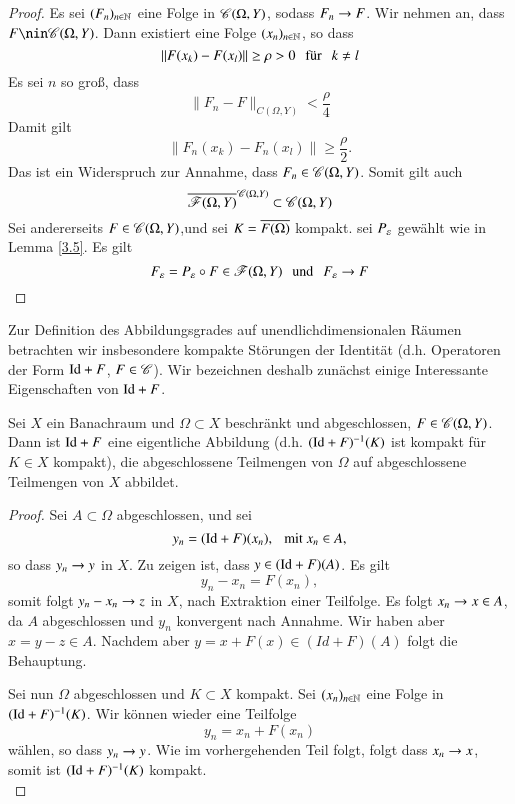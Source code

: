\begin{proof}
    Es sei $(F_n)_{n\in \mathbb{N}}$ eine Folge in $\mathscr C(\Omega,Y)$, sodass  $F_n\rightarrow F$. Wir nehmen an, dass
    $F\nin \ms C(\Omega,Y)$. Dann existiert eine Folge $(x_n)_{n\in \mathbb{N}}$, so dass
    \[
        \|F(x_k)-F(x_l)\|\geq \rho>0 \hspace{.25cm}\text{für}\hspace{.25cm} k\neq l
    \]
    Es sei $n$ so groß, dass
    \[
        \|F_n-F\|_{ C(\Omega,Y)}<\frac{\rho}{4}
    \]
    Damit gilt
    \[
        \|F_n(x_k)-F_n(x_l)\|\geq \frac\rho2.
    \]
    Das ist ein Widerspruch zur Annahme, dass $F_n\in \mathscr C(\Omega,Y)$. Somit gilt auch
    \[
        \overline{\mathscr F(\Omega,Y)}^{\mathscr C(\Omega,Y)}\subset \mathscr C(\Omega,Y)
    \]
    Sei andererseits $F\in \mathscr C(\Omega,Y)$,und sei $K=\overline{F(\Omega)}$ kompakt. sei $P_\varepsilon$ gewählt wie
    in Lemma \ref{3.5}. Es gilt
    \[
        F_\varepsilon=P_\varepsilon\circ F\in \mathscr F(\Omega,Y) \hspace{.25cm} \text{und}\hspace{.25cm} F_\varepsilon\rightarrow F
    \]
\end{proof}

Zur Definition des Abbildungsgrades auf unendlichdimensionalen Räumen betrachten wir insbesondere
kompakte Störungen der Identität (d.h. Operatoren der Form $\mathrm{Id}+F$, $F\in \mathscr C$). Wir bezeichnen deshalb
zunächst einige Interessante Eigenschaften von $\mathrm{Id}+F$.

\begin{lem}\label{3.7}
    Sei $X$ ein Banachraum und $\Omega\subset X$ beschränkt und abgeschlossen, $F\in \mathscr C(\Omega,Y)$.
    Dann ist $\mathrm{Id} + F$ eine eigentliche Abbildung (d.h. $(\mathrm{Id}+F)^{-1}(K)$ ist kompakt für $K\in X$ 
    kompakt), die abgeschlossene Teilmengen von $\Omega$ auf abgeschlossene Teilmengen von $X$ abbildet.
\end{lem}

\begin{proof}
    Sei $A\subset \Omega$ abgeschlossen, und sei
    \[
        y_n=(\mathrm{Id}+F)(x_n), \hspace{.25cm} \text{mit } x_n \in A,
    \]
    so dass $y_n \rightarrow y$ in $X$. Zu zeigen ist, dass $y\in (\mathrm{Id}+F)(A)$. Es gilt
    \[
        y_n-x_n=F(x_n),
    \]
    somit folgt $y_n-x_n\rightarrow z$ in $X$, nach Extraktion einer Teilfolge. Es folgt $x_n\rightarrow x \in A$, da
    $A$ abgeschlossen und $y_n$ konvergent nach Annahme. Wir haben aber $x=y-z\in A$. Nachdem aber
    $y=x+F(x)\in (Id+F)(A)$ folgt die Behauptung.

    Sei nun $\Omega$ abgeschlossen und $K\subset X$ kompakt. Sei $(x_n)_{n\in \mathbb{N}}$ eine Folge in
    $(\mathrm{Id}+F)^{-1}(K)$. Wir können wieder eine Teilfolge
    \[
        y_n=x_n+F(x_n)
    \]
    wählen, so dass $y_n\rightarrow y$. Wie im vorhergehenden Teil folgt, folgt dass $x_n\rightarrow x$, somit ist
    $(\mathrm{Id}+F)^{-1}(K)$ kompakt.
    \[ \]
\end{proof}

